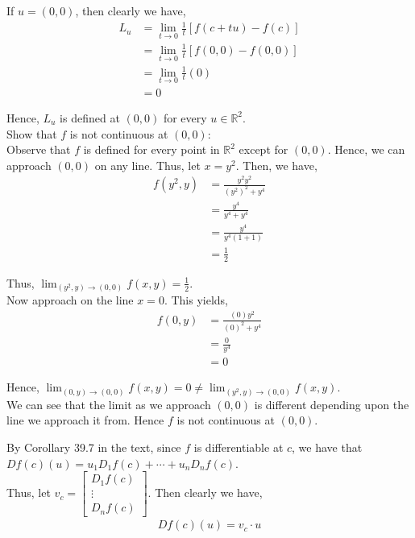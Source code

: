\documentclass[12pt]{article}
\newenvironment{problem}[2][Problem]{\begin{trivlist}
\item[\hskip \labelsep {\bfseries #1}\hskip \labelsep {\bfseries #2.}]}{\end{trivlist}}
\begin{document}
If $u = (0, 0)$, then clearly we have,
\begin{align*}
L_u &= \lim_{t \to 0} \frac{1}{t} [f(c + tu) - f(c)]\\
&= \lim_{t \to 0} \frac{1}{t} [f(0, 0) - f(0, 0)]\\
&= \lim_{t \to 0} \frac{1}{t} (0)\\
&= 0
\end{align*}

Hence, $L_u$ is defined at $(0, 0)$ for every $u \in \mathbb{R}^2$.\\

Show that $f$ is not continuous at $(0,0)$:\\

Observe that $f$ is defined for every point in $\mathbb{R}^2$ except for $(0, 0)$. Hence, we can approach $(0, 0)$ on any line. Thus, let $x = y^2$. Then, we have,
\begin{align*}
f(y^2, y) &= \frac{y^2y^2}{(y^2)^2 + y^4}\\
&= \frac{y^4}{y^4 + y^4}\\
&= \frac{y^4}{y^4(1 + 1)}\\
&= \frac{1}{2}
\end{align*}

Thus, $\lim_{(y^2, y) \to (0, 0)} f(x, y) = \frac{1}{2}$.\\

Now approach on the line $x = 0$. This yields,
\begin{align*}
f(0, y) &= \frac{(0)y^2}{(0)^2 + y^4}\\
&= \frac{0}{y^4}\\
&= 0
\end{align*}

Hence, $\lim_{(0, y) \to (0, 0)} f(x, y) = 0 \neq \lim_{(y^2, y) \to (0, 0)} f(x, y)$.\\

We can see that the limit as we approach $(0, 0)$ is different depending upon the line we approach it from. Hence $f$ is not continuous at $(0, 0)$.
\newpage
\begin{problem}{4}
\end{problem}

By Corollary 39.7 in the text, since $f$ is differentiable at $c$, we have that $Df(c)(u) = u_1D_1f(c) + \cdots + u_nD_nf(c)$.\\

Thus, let $v_c = \begin{bmatrix}D_1f(c) \\ \vdots \\ D_nf(c) \end{bmatrix}$. Then clearly we have,
\begin{align*}
Df(c)(u) = v_c \cdot u
\end{align*}
\end{document}
